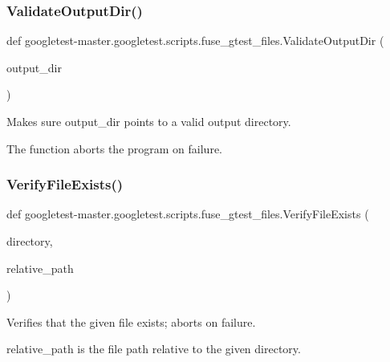 \subsubsection{\texorpdfstring{ValidateOutputDir()}{ValidateOutputDir()}}
{\footnotesize\ttfamily def googletest-\/master.\+googletest.\+scripts.\+fuse\+\_\+gtest\+\_\+files.\+Validate\+Output\+Dir (\begin{DoxyParamCaption}\item[{}]{output\+\_\+dir }\end{DoxyParamCaption})}

\begin{DoxyVerb}Makes sure output_dir points to a valid output directory.

The function aborts the program on failure.
\end{DoxyVerb}
 \mbox{\label{namespacegoogletest-master_1_1googletest_1_1scripts_1_1fuse__gtest__files_a0a9d8acbd6fdde4621dcb6d0b340486b}} 
\subsubsection{\texorpdfstring{VerifyFileExists()}{VerifyFileExists()}}
{\footnotesize\ttfamily def googletest-\/master.\+googletest.\+scripts.\+fuse\+\_\+gtest\+\_\+files.\+Verify\+File\+Exists (\begin{DoxyParamCaption}\item[{}]{directory,  }\item[{}]{relative\+\_\+path }\end{DoxyParamCaption})}

\begin{DoxyVerb}Verifies that the given file exists; aborts on failure.

relative_path is the file path relative to the given directory.
\end{DoxyVerb}
 \mbox{\label{namespacegoogletest-master_1_1googletest_1_1scripts_1_1fuse__gtest__files_a35043ca8878d7330756b286eb81fe8a9}} 

